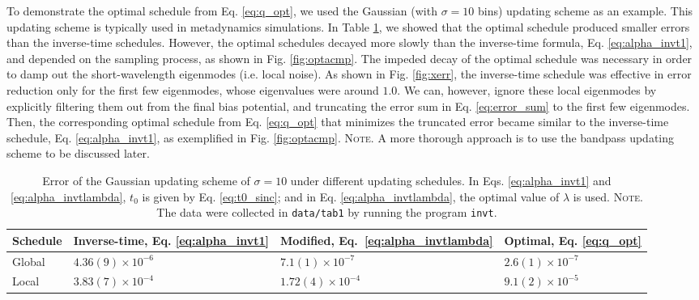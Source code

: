 \documentclass[reprint, superscriptaddress, floatfix]{revtex4-1}
\newcommand{\note}[1]{{\color{DarkGreen}\footnotesize \textsc{Note.} #1}}
\begin{document}
To demonstrate the optimal schedule from Eq. \eqref{eq:q_opt},
we used the Gaussian (with $\sigma = 10$ bins) updating scheme
as an example.
%
This updating scheme is typically used in metadynamics simulations.
%
In Table \ref{tab:error_Gaussian},
we showed that the optimal schedule
produced smaller errors than
the inverse-time schedules.
%
However, the optimal schedules
decayed more slowly than
the inverse-time formula, Eq. \eqref{eq:alpha_invt1},
and depended on the sampling process,
as shown in Fig. \ref{fig:optacmp}.
%
The impeded decay of the optimal schedule
was necessary in order to
damp out the short-wavelength eigenmodes
(i.e. local noise).
%
As shown in Fig. \ref{fig:xerr},
the inverse-time schedule was effective in error reduction
only for the first few eigenmodes,
whose eigenvalues were around $1.0$.
%
We can, however, ignore these local eigenmodes
by explicitly filtering them out from the final bias potential,
and truncating the error sum in Eq. \eqref{eq:error_sum}
to the first few eigenmodes.
%
Then, the corresponding optimal schedule
from Eq. \eqref{eq:q_opt} that minimizes the truncated error
became similar to the inverse-time schedule,
Eq. \eqref{eq:alpha_invt1},
as exemplified in Fig. \ref{fig:optacmp}.
%
\note{A more thorough approach is
to use the bandpass updating scheme
to be discussed later.
}


\begin{table}[h]\footnotesize
  \caption{\label{tab:error_Gaussian}
    Error of the Gaussian updating scheme of $\sigma = 10$
    under different updating schedules.
    In Eqs. \eqref{eq:alpha_invt1} and \eqref{eq:alpha_invtlambda},
    $t_0$ is given by Eq. \eqref{eq:t0_sinc};
    and in Eq. \eqref{eq:alpha_invtlambda},
    the optimal value of $\lambda$ is used.
    \note{\newline
      The data were collected in
      \texttt{data/tab1} by running
      the program \texttt{invt}.
    }%
  }
  \setlength{\tabcolsep}{2pt}
  \renewcommand\arraystretch{1.2}
  \begin{tabular} { l | p{2.2cm} p{2.4cm} p{2.0cm} }
    \hline
      Schedule
    &
      Inverse-time, \newline
      Eq. \eqref{eq:alpha_invt1}
    &
      Modified, \newline
      Eq.~\eqref{eq:alpha_invtlambda}
    &
      Optimal, \newline
      Eq. \eqref{eq:q_opt}
    \\
    \hline
    Global
    &
    $4.36(9) \times 10^{-6}$
    &
    $7.1(1) \times 10^{-7}$
    &
    $2.6(1) \times 10^{-7}$
    \\
    \hline
    Local
    &
    $3.83(7) \times 10^{-4}$
    &
    $1.72(4) \times 10^{-4}$
    &
    $9.1(2) \times 10^{-5}$
    \\
    \hline
  \end{tabular}
\end{table}
\end{document}
